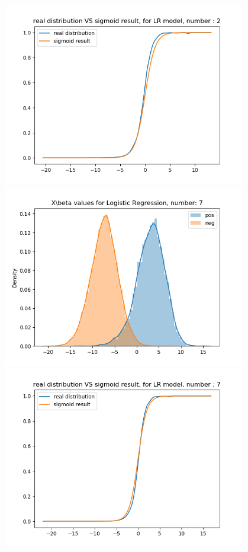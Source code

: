 \documentclass{article}
\begin{document}
\begin{figure}[H]
\begin{minipage}{0.19\textwidth}
        \includegraphics[width=0.95\textwidth]{fig/lr/2-2.png}
        \includegraphics[width=0.95\textwidth]{fig/lr/7.png}
        \includegraphics[width=0.95\textwidth]{fig/lr/7-2.png}

\end{minipage}
\end{figure}
\end{document}
